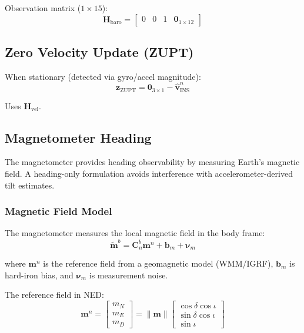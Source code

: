 \documentclass[11pt,a4paper]{article}
\newcommand{\mat}[1]{\mathbf{#1}}
\newcommand{\vect}[1]{\boldsymbol{#1}}
\begin{document}
Observation matrix ($1 \times 15$):
\begin{equation}
    \mat{H}_{\text{baro}} = \begin{bmatrix}
        0 & 0 & 1 & \mat{0}_{1\times12}
    \end{bmatrix}
\end{equation}

\subsection{Zero Velocity Update (ZUPT)}

When stationary (detected via gyro/accel magnitude):
\begin{equation}
    \mat{z}_{\text{ZUPT}} = \mat{0}_{3\times1} - \hat{\mat{v}}_{\text{INS}}^n
\end{equation}

Uses $\mat{H}_{\text{vel}}$.

\subsection{Magnetometer Heading}

The magnetometer provides heading observability by measuring Earth's magnetic field. A heading-only formulation avoids interference with accelerometer-derived tilt estimates.

\subsubsection{Magnetic Field Model}

The magnetometer measures the local magnetic field in the body frame:
\begin{equation}
    \tilde{\mat{m}}^b = \mat{C}_n^b \mat{m}^n + \mat{b}_m + \vect{\nu}_m
\end{equation}

where $\mat{m}^n$ is the reference field from a geomagnetic model (WMM/IGRF), $\mat{b}_m$ is hard-iron bias, and $\vect{\nu}_m$ is measurement noise.

The reference field in NED:
\begin{equation}
    \mat{m}^n = \begin{bmatrix} m_N \\ m_E \\ m_D \end{bmatrix} = \|\mat{m}\| \begin{bmatrix} \cos\delta\cos\iota \\ \sin\delta\cos\iota \\ \sin\iota \end{bmatrix}
\end{equation}
\end{document}
